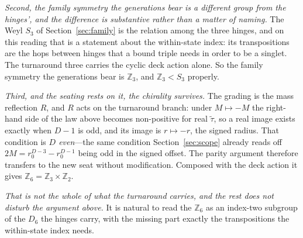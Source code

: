 \documentclass[11pt]{article}
\begin{document}
\emph{Second, the family symmetry the generations bear is a different group from the hinges', and the
difference is substantive rather than a matter of naming.} The Weyl $S_{3}$ of Section~\ref{sec:family} is the relation among the three hinges, and on this
reading that is a statement about the within-state index: its transpositions are the hops between hinges that a
bound triple needs in order to be a singlet. The turnaround three carries the cyclic deck action alone. So the
family symmetry the generations bear is $\mathbb{Z}_{3}$, and $\mathbb{Z}_{3}<S_{3}$ properly.

\emph{Third, and the seating rests on it, the chirality survives.} The
grading is the mass reflection $R$, and $R$ acts on the turnaround branch: under $M\mapsto-M$ the right-hand
side of the law above becomes non-positive for real $\tilde\tau$, so a real image exists exactly when $D-1$ is
odd, and its image is $r\mapsto-r$, the signed radius. That condition is \emph{$D$ even}---the same condition
Section~\ref{sec:scope} already reads off $2M=r_{0}^{D-3}-r_{0}^{D-1}$ being odd in the signed
offset. The parity argument therefore transfers to the new seat without
modification. Composed with the deck action it gives $\mathbb{Z}_{6}=\mathbb{Z}_{3}\times\mathbb{Z}_{2}$.

\emph{That is not the whole of what the turnaround carries, and the rest does not disturb the argument
above.} It is natural to read the $\mathbb{Z}_{6}$ as an index-two subgroup of
the $D_{6}$ the hinges carry, with the missing part exactly the transpositions the within-state index needs.
\end{document}
